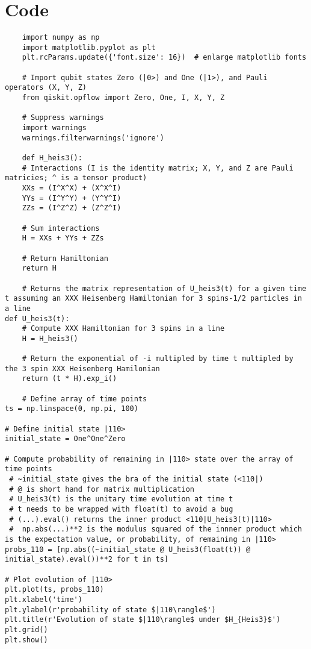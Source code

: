 \chapter{Code}
\begin{verbatim}
    import numpy as np
    import matplotlib.pyplot as plt
    plt.rcParams.update({'font.size': 16})  # enlarge matplotlib fonts
    
    # Import qubit states Zero (|0>) and One (|1>), and Pauli operators (X, Y, Z)
    from qiskit.opflow import Zero, One, I, X, Y, Z
    
    # Suppress warnings
    import warnings
    warnings.filterwarnings('ignore')

    def H_heis3():
    # Interactions (I is the identity matrix; X, Y, and Z are Pauli matricies; ^ is a tensor product)
    XXs = (I^X^X) + (X^X^I)
    YYs = (I^Y^Y) + (Y^Y^I)
    ZZs = (I^Z^Z) + (Z^Z^I)
    
    # Sum interactions
    H = XXs + YYs + ZZs
    
    # Return Hamiltonian
    return H

    # Returns the matrix representation of U_heis3(t) for a given time t assuming an XXX Heisenberg Hamiltonian for 3 spins-1/2 particles in a line
def U_heis3(t):
    # Compute XXX Hamiltonian for 3 spins in a line
    H = H_heis3()
    
    # Return the exponential of -i multipled by time t multipled by the 3 spin XXX Heisenberg Hamilonian 
    return (t * H).exp_i()

    # Define array of time points
ts = np.linspace(0, np.pi, 100)

# Define initial state |110>
initial_state = One^One^Zero

# Compute probability of remaining in |110> state over the array of time points
 # ~initial_state gives the bra of the initial state (<110|)
 # @ is short hand for matrix multiplication
 # U_heis3(t) is the unitary time evolution at time t
 # t needs to be wrapped with float(t) to avoid a bug
 # (...).eval() returns the inner product <110|U_heis3(t)|110>
 #  np.abs(...)**2 is the modulus squared of the innner product which is the expectation value, or probability, of remaining in |110>
probs_110 = [np.abs((~initial_state @ U_heis3(float(t)) @ initial_state).eval())**2 for t in ts]

# Plot evolution of |110>
plt.plot(ts, probs_110)
plt.xlabel('time')
plt.ylabel(r'probability of state $|110\rangle$')
plt.title(r'Evolution of state $|110\rangle$ under $H_{Heis3}$')
plt.grid()
plt.show()


\end{verbatim}
